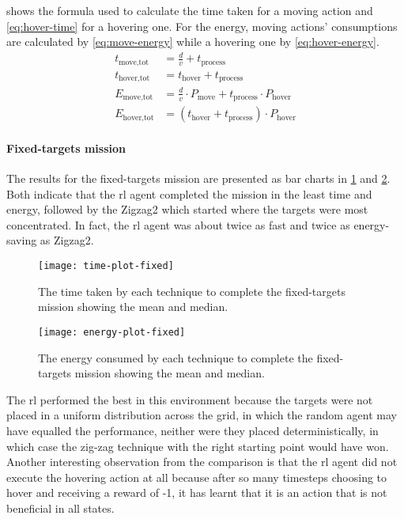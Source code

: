 \documentclass[../main.tex]{subfiles}
\begin{document}
 shows the formula used to
calculate the time taken for a moving action and
\cref{eq:hover-time} for a hovering one.
For the energy, moving actions' consumptions are calculated
by \cref{eq:move-energy} while a hovering one by
\cref{eq:hover-energy}.
\begin{align}
t_{\text{move,tot}} &= 
\frac{d}{v} + t_{\text{process}}
	\label{eq:move-time}
        \\
t_{\text{hover,tot}} &= 
t_{\text{hover}} + t_{\text{process}}
	\label{eq:hover-time}
        \\
E_{\text{move,tot}} &= 
\frac{d}{v} \cdot P_{\text{move}} 
+ t_{\text{process}} \cdot P_{\text{hover}}
	\label{eq:move-energy}
        \\
E_{\text{hover,tot}} &= 
\left( t_{\text{hover}} + t_{\text{process}} \right) \cdot P_{\text{hover}}
	\label{eq:hover-energy}
\end{align}

\paragraph{Fixed-targets mission}

The results for the fixed-targets mission are presented as bar charts in 
\cref{fig:time-plot-fixed} and \cref{fig:energy-plot-fixed}.
Both indicate that the \gls{rl} agent completed
the mission in the least time and energy, followed by the
Zigzag2 which started where the targets were most concentrated.
In fact, the \gls{rl} agent was about twice as fast and twice
as energy-saving as Zigzag2.

\begin{figure}[p]
	\centering
	\texttt{[image: time-plot-fixed]}
	\caption{The time taken by each technique
            to complete the fixed-targets mission showing the mean and
    median.}
        \label{fig:time-plot-fixed}
\end{figure}

\begin{figure}[p]
	\centering
	\texttt{[image: energy-plot-fixed]}
	\caption{The energy consumed by each technique
            to complete the fixed-targets mission showing the mean and
    median.}
        \label{fig:energy-plot-fixed}
\end{figure}

The \gls{rl} performed the best in this environment because
the targets were not placed in a uniform distribution
across the grid,
in which the random agent may have equalled the performance,
neither were they placed deterministically, 
in which case the zig-zag technique with the
right starting point would have won.
Another interesting observation from the comparison is that
the \gls{rl} agent did not execute the hovering action at all
because after so many timesteps choosing to hover and
receiving a reward of -1, it has learnt that it is an
action that is not beneficial in all states.
\end{document}
